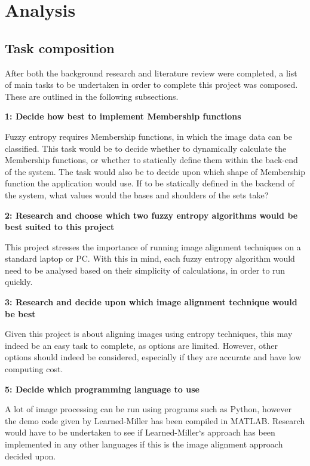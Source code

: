 \section{Analysis}

\subsection{Task composition}

After both the background research and literature review were completed, a list of main tasks to be undertaken in order to complete this project was composed. These are outlined in the following subsections.

\noindent \textbf{1: Decide how best to implement Membership functions}

Fuzzy entropy requires Membership functions, in which the image data can be classified. This task would be to decide whether to dynamically calculate the Membership functions, or whether to statically define them within the back-end of the system. The task would also be to decide upon which shape of Membership function the application would use. If to be statically defined in the backend of the system, what values would the bases and shoulders of the sets take?

\noindent \textbf{2: Research and choose which two fuzzy entropy algorithms would be best suited to this project}

This project stresses the importance of running image alignment techniques on a standard laptop or PC. With this in mind, each fuzzy entropy algorithm would need to be analysed based on their simplicity of calculations, in order to run quickly.

\noindent \textbf{3: Research and decide upon which image alignment technique would be best}

Given this project is about aligning images using entropy techniques, this may indeed be an easy task to complete, as options are limited. However, other options should indeed be considered, especially if they are accurate and have low computing cost.

\noindent \textbf{5: Decide which programming language to use}

A lot of image processing can be run using programs such as Python, however the demo code given by Learned-Miller \cite{joint-alignment} has been compiled in MATLAB. Research would have to be undertaken to see if Learned-Miller`s approach has been implemented in any other languages if this is the image alignment approach decided upon.

